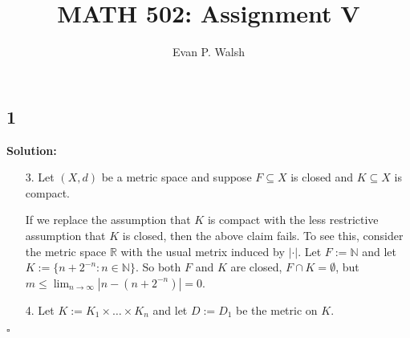 \documentclass[12pt]{article}
\title{MATH 502: Assignment V}
\author{Evan P. Walsh}
\newcounter{ProofCounter}
\newcounter{ClaimCounter}[ProofCounter]
\newenvironment{Solution}{\stepcounter{ProofCounter}\textbf{Solution:}}{\hfill$\square$}
\newenvironment{claim}[1]{\vspace{1mm}\stepcounter{ClaimCounter}\par\noindent\underline{\bf Claim \theClaimCounter:}\space#1}{}
\newenvironment{claimproof}[1]{\par\noindent\underline{Proof of claim \theClaimCounter:}\space#1}{\hfill $\blacksquare$ Claim \theClaimCounter}
\begin{document}
\maketitle


\subsection*{1}
\begin{Solution}
  \begin{enumerate}
    \item[3.] Let $(X,d)$ be a metric space and suppose $F \subseteq X$ is closed and $K \subseteq X$ is compact.
      

      If we replace the assumption that $K$ is compact with the less restrictive assumption that $K$ is closed, then the above claim fails. To see this,
      consider the metric space $\mathbb{R}$ with the usual metrix induced by $|\cdot |$. Let $F := \mathbb{N}$ and let $K := \{n + 2^{-n}: n \in
      \mathbb{N}\}$. So both $F$ and $K$ are closed, $F \cap K = \emptyset$, but $m \leq \lim_{n\rightarrow\infty}|n - (n+2^{-n})| = 0$.

    \item[4.] Let $K := K_1 \times \dots \times K_{n}$ and let $D := D_1$ be the metric on $K$.


\end{enumerate}
\end{Solution}
\end{document}
